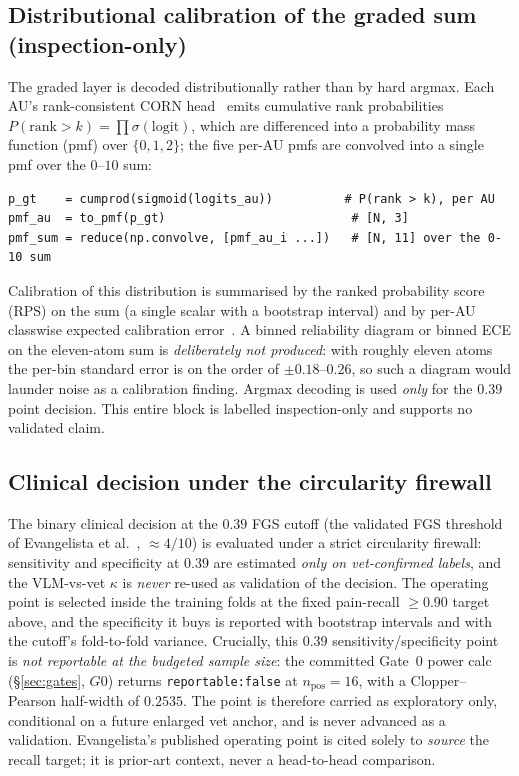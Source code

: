 \subsection{Distributional calibration of the graded sum (inspection-only)}

The graded layer is decoded distributionally rather than by hard argmax. Each AU's
rank-consistent CORN head~\cite{shi2023corn} emits cumulative rank probabilities
$P(\text{rank} > k) = \prod \sigma(\text{logit})$, which are differenced into a probability
mass function (pmf) over $\{0,1,2\}$; the five per-AU pmfs are convolved into a single pmf over
the $0\text{--}10$ sum:

\begin{verbatim}
p_gt    = cumprod(sigmoid(logits_au))          # P(rank > k), per AU
pmf_au  = to_pmf(p_gt)                          # [N, 3]
pmf_sum = reduce(np.convolve, [pmf_au_i ...])   # [N, 11] over the 0-10 sum
\end{verbatim}

Calibration of this distribution is summarised by the ranked probability score
(RPS) on the sum (a single scalar with a bootstrap interval) and by per-AU classwise expected
calibration error~\cite{guo2017calibration}. A binned reliability diagram or binned ECE on the
eleven-atom sum is \emph{deliberately not produced}: with roughly eleven atoms the per-bin
standard error is on the order of $\pm 0.18\text{--}0.26$, so such a diagram would launder noise
as a calibration finding. Argmax decoding is used \emph{only} for the $0.39$ point decision.
This entire block is labelled inspection-only and supports no validated claim.

\subsection{Clinical decision under the circularity firewall}

The binary clinical decision at the $0.39$ FGS cutoff (the validated FGS threshold of
Evangelista et al.~\cite{evangelista2019}, $\approx 4/10$) is evaluated under a strict
circularity firewall:
sensitivity and specificity at $0.39$ are estimated \emph{only on vet-confirmed labels}, and
the VLM-vs-vet $\kappa$ is \emph{never} re-used as validation of the decision. The operating
point is selected inside the training folds at the fixed pain-recall $\geq 0.90$ target above,
and the specificity it buys is reported with bootstrap intervals and with the cutoff's
fold-to-fold variance. Crucially, this $0.39$ sensitivity/specificity point is \emph{not
reportable at the budgeted sample size}: the committed Gate~0 power calc
(\S\ref{sec:gates}, $G0$) returns \texttt{reportable:false} at $n_{\text{pos}}{=}16$, with a
Clopper--Pearson half-width of $0.2535$. The point is therefore carried as exploratory only,
conditional on a future enlarged vet anchor, and is never advanced as a validation.
Evangelista's published operating point is cited solely to \emph{source}
the recall target; it is prior-art context, never a head-to-head comparison.

